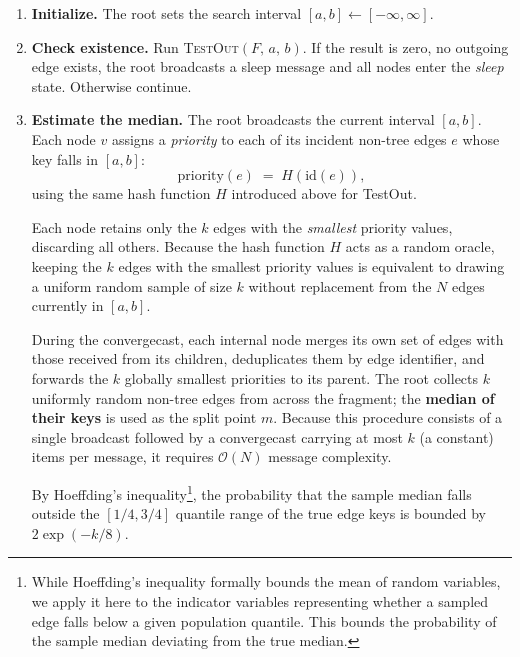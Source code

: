 \begin{enumerate}
 
    \item \textbf{Initialize.}
        The root sets the search interval $[a,b] \gets [-\infty, \infty]$.

    \item \textbf{Check existence.}
        Run \textsc{TestOut}$(F,\,a,\,b)$.
        If the result is zero, no outgoing edge exists, the root broadcasts a sleep
        message and all nodes enter the \emph{sleep} state.
        Otherwise continue.
 
    \item \textbf{Estimate the median.}
        The root broadcasts the current interval $[a,b]$. Each node $v$ assigns a
        \emph{priority} to each of its incident non-tree edges $e$ whose key falls in
        $[a,b]$:
        \[
            \mathrm{priority}(e)
            \;=\;
            H\!\left(\mathrm{id}(e)\right),
        \]
        using the same hash function $H$ introduced above for TestOut.

        Each node retains only the $k$ edges with the \emph{smallest} priority values,
        discarding all others. Because the hash function $H$ acts as a random oracle,
        keeping the $k$ edges with the smallest priority values is equivalent to drawing a
        uniform random sample of size $k$ without replacement from the $N$ edges currently
        in $[a,b]$.

        During the convergecast, each internal node merges its own set of edges with those
        received from its children, deduplicates them by edge identifier, and forwards the
        $k$ globally smallest priorities to its parent.
        The root collects $k$ uniformly random non-tree edges from across the fragment;
        the \textbf{median of their keys} is used as the split point $m$.
        Because this procedure consists of a single broadcast followed by a convergecast
        carrying at most $k$ (a constant) items per message, it requires $\mathcal{O}(N)$
        message complexity.

        By Hoeffding's inequality\footnote{While Hoeffding's inequality formally bounds
        the mean of random variables, we apply it here to the indicator variables
        representing whether a sampled edge falls below a given population quantile. This
        bounds the probability of the sample median deviating from the true median.}, the
        probability that the sample median falls outside the $[1/4, 3/4]$ quantile range
        of the true edge keys is bounded by $2\exp(-k/8)$.


\end{enumerate}
